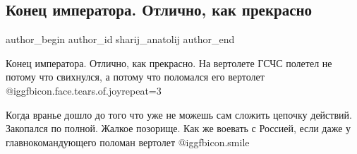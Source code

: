  
 
 
 
 
 
\subsection{Конец императора. Отлично, как прекрасно}
\label{sec:26_11_2021.fb.sharij_anatolij.1.konec_imperatora}
 
\ifcmt
 author_begin
   author_id sharij_anatolij
 author_end
\fi

Конец императора. Отлично, как прекрасно. На вертолете ГСЧС полетел не потому
что свихнулся, а потому что поломался его вертолет @igg{fbicon.face.tears.of.joy}{repeat=3} 

\begin{cmtfront}

Когда вранье дошло до того что уже не можешь сам сложить цепочку действий.
Закопался по полной. Жалкое позорище. Как же воевать с Россией, если даже у
главнокомандующего поломан вертолет  @igg{fbicon.smile} 

\end{cmtfront}


